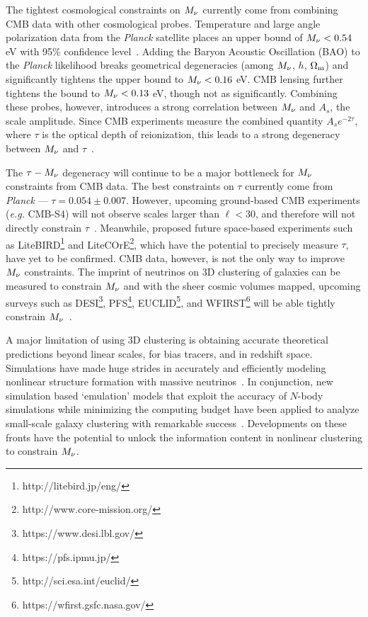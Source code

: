 The tightest cosmological constraints on $M_\nu$ currently come from 
combining CMB data with other cosmological probes. Temperature and large 
angle polarization data from the {\em Planck} satellite places an upper 
bound of $M_\nu < 0.54$ eV with 95\% confidence level~\citep{planckcollaboration2018}. 
Adding the Baryon Acoustic Oscillation (BAO) to the {\em Planck} 
likelihood breaks geometrical degeneracies (among $M_\nu$, $h$, $\Omega_{\rm m}$) 
and significantly tightens the upper bound to $M_\nu < 0.16$ eV. CMB 
lensing further tightens the bound to $M_\nu < 0.13$ eV, though 
not as significantly. Combining these probes, however, introduces a strong 
correlation between $M_\nu$ and $A_s$, the scale amplitude. Since CMB 
experiments measure the combined quantity $A_s e^{-2\tau}$, where 
$\tau$ is the optical depth of reionization, this leads to a strong 
degeneracy between $M_\nu$ and $\tau$~\citep{allison2015, liu2016, archidiacono2017}. 

The $\tau-M_\nu$ degeneracy will continue to be a major bottleneck 
for $M_\nu$ constraints from CMB data. The best constraints on $\tau$ 
currently come from {\em Planck} --- $\tau = 0.054\pm0.007$. However, upcoming 
ground-based CMB experiments ({\em e.g.} CMB-S4) will not observe scales 
larger than $\ell < 30$, and therefore will not directly constrain 
$\tau$~\citep{abazajian2016}. Meanwhile, proposed future space-based 
experiments such as LiteBIRD\footnote{http://litebird.jp/eng/} and 
LiteCOrE\footnote{http://www.core-mission.org/}, which have the potential 
to precisely measure $\tau$, have yet to be confirmed. CMB data, however, 
is not the only way to improve $M_\nu$ constraints. The imprint of 
neutrinos on 3D clustering of galaxies can be measured to constrain 
$M_\nu$ and with the sheer cosmic volumes mapped, upcoming surveys such 
as DESI\footnote{https://www.desi.lbl.gov/}, PFS\footnote{https://pfs.ipmu.jp/}, 
EUCLID\footnote{http://sci.esa.int/euclid/}, and WFIRST\footnote{https://wfirst.gsfc.nasa.gov/} 
will be able tightly constrain 
$M_\nu$~\citep{audren2013, font-ribera2014, petracca2016, sartoris2016, boyle2018}.

A major limitation of using 3D clustering is obtaining accurate theoretical 
predictions beyond linear scales, for bias tracers, and in redshift space. 
Simulations have made huge strides in accurately and efficiently modeling 
nonlinear structure formation with massive neutrinos~\citep[\emph{e.g.}][]{brandbyge2008, 
villaescusa-navarro2013, castorina2015, adamek2017, emberson2017, villaescusa-navarro2018}. 
In conjunction, new simulation based `emulation' models that exploit the 
accuracy of $N$-body simulations while minimizing the computing budget 
have been applied to analyze small-scale galaxy clustering with remarkable 
success~\citep[\emph{e.g.}][]{heitmann2009, kwan2015, euclidcollaboration2018, mcclintock2018, zhai2018, wibking2019}. 
Developments on these fronts have the potential to unlock the information 
content in nonlinear clustering to constrain $M_\nu$. 

